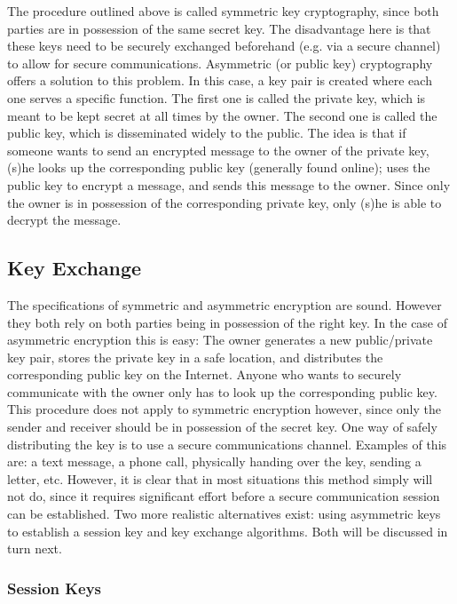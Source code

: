 The procedure outlined above is called symmetric key cryptography, since both parties are in possession of the same secret key. The disadvantage here is that these keys need to be securely exchanged beforehand (e.g. via a secure channel) to allow for secure communications. Asymmetric (or public key) cryptography offers a solution to this problem. In this case, a key pair is created where each one serves a specific function. The first one is called the private key, which is meant to be kept secret at all times by the owner. The second one is called the public key, which is disseminated widely to the public. The idea is that if someone wants to send an encrypted message to the owner of the private key, (s)he looks up the corresponding public key (generally found online); uses the public key to encrypt a message, and sends this message to the owner. Since only the owner is in possession of the corresponding private key, only (s)he is able to decrypt the message.

\subsection{Key Exchange} 
\label{sec:key_exchange}

The specifications of symmetric and asymmetric encryption are sound. However they both rely on both parties being in possession of the right key. In the case of asymmetric encryption this is easy: The owner generates a new public/private key pair, stores the private key in a safe location, and distributes the corresponding public key on the Internet. Anyone who wants to securely communicate with the owner only has to look up the corresponding public key. This procedure does not apply to symmetric encryption however, since only the sender and receiver should be in possession of the secret key. One way of safely distributing the key is to use a secure communications channel. Examples of this are: a text message, a phone call, physically handing over the key, sending a letter, etc. However, it is clear that in most situations this method simply will not do, since it requires significant effort before a secure communication session can be established. Two more realistic alternatives exist: using asymmetric keys to establish a session key and key exchange algorithms. Both will be discussed in turn next.

\subsubsection{Session Keys} 
\label{subsec:session_keys}

